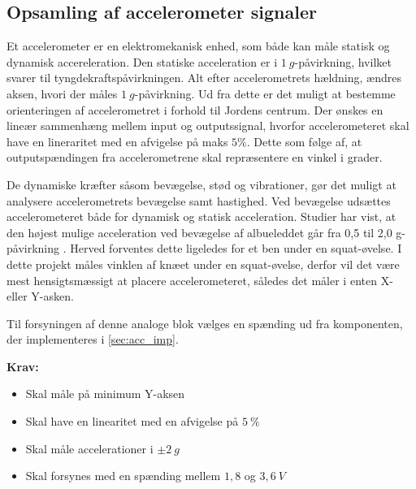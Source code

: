 \subsection{Opsamling af accelerometer signaler} \label{sec:acc_teori}
Et accelerometer er en elektromekanisk enhed, som både kan måle statisk og dynamisk accereleration. 
Den statiske acceleration er i $1~g$-påvirkning, hvilket svarer til tyngdekraftspåvirkningen. 
Alt efter accelerometrets hældning, ændres aksen, hvori der måles $1~g$-påvirkning. 
Ud fra dette er det muligt at bestemme orienteringen af accelerometret i forhold til Jordens centrum. 
Der ønskes en lineær sammenhæng mellem input og outputssignal, hvorfor accelerometeret skal have en lineraritet med en afvigelse på maks $5\%$. Dette som følge af, at outputspændingen fra accelerometrene skal repræsentere en vinkel i grader.

De dynamiske kræfter såsom bevægelse, stød og vibrationer, gør det muligt at analysere accelerometrets bevægelse samt hastighed. 
Ved bevægelse udsættes accelerometeret både for dynamisk og statisk acceleration. 
Studier har vist, at den højest mulige acceleration ved bevægelse af albueleddet går fra 0,5 til 2,0 g-påvirkning \citep{bernmarka2002}. 
Herved forventes dette ligeledes for et ben under en squat-øvelse. 
I dette projekt måles vinklen af knæet under en squat-øvelse, derfor vil det være mest hensigtsmæssigt at placere accelerometeret, således det måler i enten X- eller Y-asken. 

Til forsyningen af denne analoge blok vælges en spænding ud fra komponenten, der implementeres i \autoref{sec:acc_imp}.



\vspace{3mm}
\textbf{Krav:}
\begin{itemize}
\item Skal måle på minimum Y-aksen
\item Skal have en linearitet med en afvigelse på $5~\%$
\item Skal måle accelerationer i $\pm 2~g$
\item Skal forsynes med en spænding mellem $1,8$ og $3,6~V$
\end{itemize}